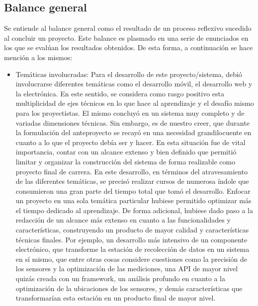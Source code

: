 \subsection{Balance general}

    \par Se entiende al balance general como el resultado de un proceso reflexivo sucedido al concluir un proyecto. Este balance es plasmado en una serie de enunciados en los que se evalúan los resultados obtenidos. De esta forma, a continuación se hace mención a los mismos:
    
    \begin{itemize}

        \item{Temáticas involucradas:} Para el desarrollo de este proyecto/sistema, debió involucrarse diferentes temáticas como el desarrollo móvil, el desarrollo web y la electrónica. En este sentido, se considera como rasgo positivo esta multiplicidad de ejes técnicos en lo que hace al aprendizaje y el desafío mismo para los proyectistas. El mismo concluyó en un sistema muy completo y de variadas dimensiones técnicas. Sin embargo, es de nuestro creer, que durante la formulación del anteproyecto se recayó en una necesidad grandilocuente en cuanto a lo que el proyecto debía ser y hacer. En esta situación fue de vital importancia, contar con un alcance extenso y bien definido que permitió limitar y organizar la construcción del sistema de forma realizable como proyecto final de carrera. En este desarrollo, en términos del atravesamiento de las diferentes temáticas, se precisó realizar cursos de numerosa índole que consumieron una gran parte del tiempo total que tomó el desarrollo. Enfocar un proyecto en una sola temática particular hubiese permitido optimizar más el tiempo dedicado al aprendizaje. De forma adicional, hubiese dado paso a la redacción de un alcance más extenso en cuanto a las funcionalidades y características, construyendo un producto de mayor calidad y características técnicas finales. Por ejemplo, un desarrollo más intensivo de un componente electrónico, que transforme la estación de recolección de datos en un sistema en sí mismo, que entre otras cosas considere cuestiones como la precisión de los sensores y la optimización de las mediciones, una API de mayor nivel quizás creada con un framework, un análisis profundo en cuanto a la optimización de la ubicaciones de los sensores, y demás características que transformarían esta estación en un producto final de mayor nivel. 
        

\end{itemize}
